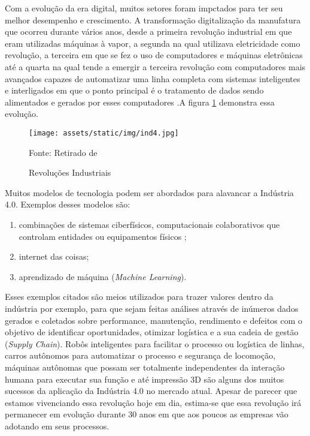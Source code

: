 \documentclass[../../layout.tex]{subfiles}
\begin{document}
\hspace*{3em}Com a evolução da era digital, muitos setores foram impctados para ter seu melhor desempenho e crescimento. A transformação digitalização da manufatura que ocorreu durante vários anos, desde a primeira revolução industrial em que eram utilizadas máquinas à vapor, a segunda na qual utilizava eletricidade como revolução, a terceira em que se fez o uso de computadores e máquinas eletrônicas até a quarta na qual tende a emergir a terceira revolução com computadores mais avançados capazes de automatizar uma linha completa com sistemas inteligentes e interligados em que o ponto principal é o tratamento de dados sendo alimentados e gerados por esses computadores \cite{ind4}.A figura \ref{fig:ind} demonstra essa evolução.

\begin{figure}[H]
\centering
\caption{Revoluções Industriais}
\texttt{[image: assets/static/img/ind4.jpg]}
\label{fig:ind}

\begin{minipage}{0.7\textwidth}
\raggedright \footnotesize Fonte: Retirado de \cite{ind4} 
\end{minipage}
\end{figure}


\hspace*{3em}Muitos modelos de tecnologia podem ser abordados para alavancar a Indústria 4.0. Exemplos desses modelos são:
\begin{enumerate}[label=\alph*)]
\itemsep0em
    \item combinações de sistemas ciberfísicos, computacionais colaborativos que controlam entidades ou equipamentos físicos \cite{cyberphysic};
    \item internet das coisas;
    \item aprendizado de máquina (\emph{Machine Learning}).
\end{enumerate}

\hspace*{3em}Esses exemplos citados são meios utilizados para trazer valores dentro da indústria por exemplo, para que sejam feitas análises através de inúmeros dados gerados e coletados sobre performance, manutenção, rendimento e defeitos com o objetivo de identificar oportunidades, otimizar logística e a sua cadeia de gestão (\emph{Supply Chain}). Robôs inteligentes para facilitar o processo ou logística de linhas, carros autônomos para automatizar o processo e segurança de locomoção, máquinas autônomas que possam ser totalmente independentes da interação humana para executar sua função e até impressão 3D são alguns dos muitos sucessos da aplicação da Indústria 4.0 no mercado atual. Apesar de parecer que estamos vivenciando essa revolução hoje em dia, estima-se que essa revolução irá permanecer em evolução durante 30 anos em que aos poucos as empresas vão adotando em seus processos.
\end{document}
